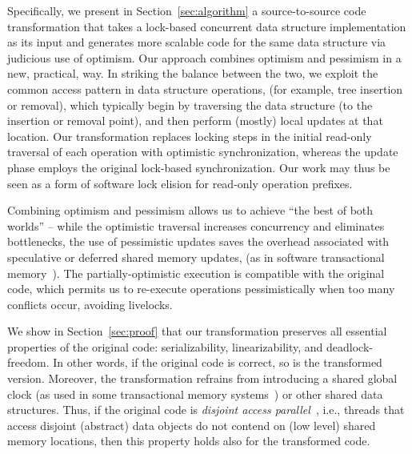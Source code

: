 Specifically, we present in Section~\ref{sec:algorithm} a source-to-source
code transformation that takes a lock-based concurrent data structure implementation as its input 
and generates more scalable code for the same data structure via judicious use of optimism. 
Our approach combines optimism and pessimism in a new, practical, way. 
In striking the balance between the two, we exploit the common access pattern in data structure operations,
(for example, tree insertion or removal), which typically begin by traversing the data structure (to the insertion or removal point), and then perform (mostly) local updates at that location.
Our transformation replaces locking steps in the initial read-only traversal of each operation with 
optimistic synchronization, whereas the update phase employs the original lock-based synchronization. 
Our work may thus be seen as a form of software lock elision for read-only operation prefixes.

Combining optimism and pessimism allows us to achieve ``the best of both worlds'' -- while the
optimistic traversal increases concurrency and eliminates bottlenecks, 
the use of pessimistic updates saves the overhead associated with speculative or deferred shared
memory updates, (as in software transactional memory~\cite{HLR:SLCA2010}). 
The partially-optimistic execution is compatible with the original code, which permits us to re-execute operations 
pessimistically when too many conflicts occur, avoiding livelocks. 

We show in Section~\ref{sec:proof} that our transformation preserves all essential properties of the original code: serializability, linearizability, and deadlock-freedom. In other words, if the original code is correct, so is the 
transformed version. Moreover, the transformation 
refrains from introducing a shared global clock (as used in some transactional memory systems~\cite{DBLP:conf/eurosys/ShalevS06}) or other
shared data structures. Thus, if the original code is \emph{disjoint access parallel}~\cite{Israeli:1994:DIS:197917.198079}, i.e., threads 
that access disjoint (abstract) data objects do not contend on (low level) shared memory locations, then this 
property holds also for the transformed code. 


